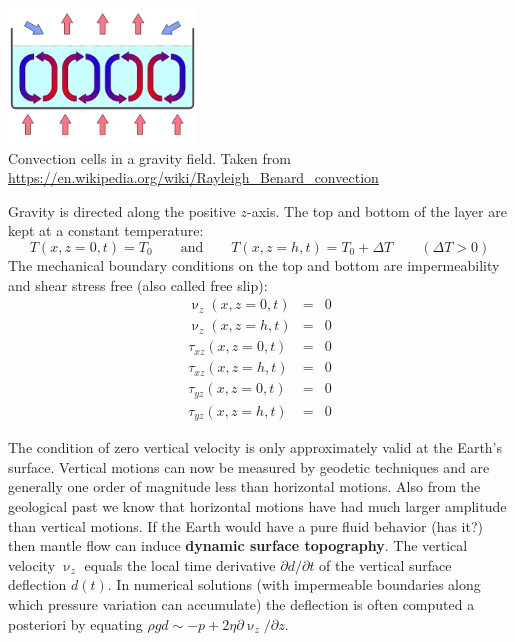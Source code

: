 \begin{center}
\includegraphics[width=5cm]{images/chapter_md/RBconv}\\
{\captionfont Convection cells in a gravity field. Taken from \url{https://en.wikipedia.org/wiki/Rayleigh_Benard_convection}}
\end{center}

Gravity is directed along the positive $z$-axis. The top and bottom of the layer are kept at a
constant temperature:
\begin{equation}
T(x,z=0,t)=T_0 
\qquad
\text{and}
\qquad
T(x,z=h,t)=T_0 + \Delta T \qquad (\Delta T>0)
\end{equation}
The mechanical boundary conditions on the top and bottom are impermeability and shear
stress free (also called free slip):
\begin{eqnarray}
\upnu_z(x,z=0,t) &=& 0 \\
\upnu_z(x,z=h,t) &=& 0 \\
\tau_{xz}(x,z=0,t) &=& 0 \\
\tau_{xz}(x,z=h,t) &=& 0 \\
\tau_{yz}(x,z=0,t) &=& 0 \\
\tau_{yz}(x,z=h,t) &=& 0 
\end{eqnarray}

\vspace{0.5cm}
\vspace{0.5cm}

The condition of zero vertical velocity is only approximately valid at the Earth’s surface.
Vertical motions can now be measured by geodetic techniques and are generally one
order of magnitude less than horizontal motions. Also from the geological past we know
that horizontal motions have had much larger amplitude than vertical motions. If the
Earth would have a pure fluid behavior (has it?) then mantle flow can induce {\bf dynamic
surface topography}. The vertical velocity $\upnu_z$ equals the local time derivative
$\partial d/\partial t$ of the vertical surface deflection $d(t)$. 
In numerical solutions (with impermeable boundaries
along which pressure variation can accumulate) the deflection is often computed a
posteriori by equating $\rho g d \sim -p + 2\eta \partial \upnu_z/\partial z$.

